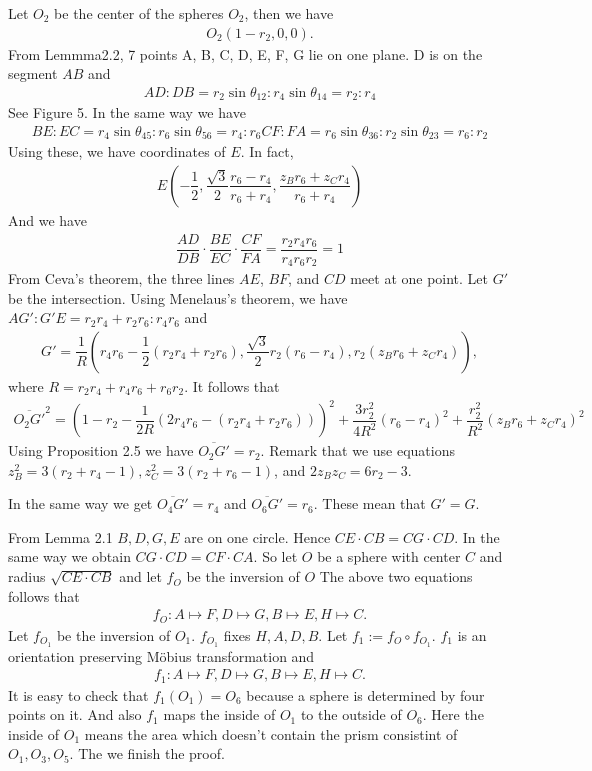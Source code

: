 \documentclass[dvipdfmx]{interact}
\theoremstyle{plain}%
\theoremstyle{definition}
\theoremstyle{remark}
\theoremstyle{problemstyle}
\begin{document}
Let $O_2$ be the center of the spheres $O_2$, then we have
\begin{align*}
 O_2(1 - r_2, 0, 0).
\end{align*}
From Lemmma2.2, 7 points A, B, C, D, E, F, G lie on one plane. D is on
the segment $AB$ and
\begin{align*}
 AD : DB = r_2\sin\theta_{12} : r_4\sin\theta_{14} = r_2 : r_4
\end{align*}
See Figure 5. In the same way we have
\begin{align*}
 BE : EC = r_4\sin\theta_{45} : r_6\sin\theta_{56} = r_4:r_6
 CF : FA = r_6\sin\theta_{36} : r_2\sin\theta_{23} = r_6:r_2
\end{align*}
Using these, we have coordinates of $E$. In fact,
\begin{align*}
 E(-\dfrac{1}{2},\dfrac{\sqrt{3}}{2}\dfrac{r_6-r_4}{r_6 + r_4},
 \dfrac{z_Br_6 + z_C r_4}{r_6 + r_4})
\end{align*}
And we have
\begin{align*}
 \dfrac{AD}{DB} \cdot \dfrac{BE}{EC} \cdot \dfrac{CF}{FA} = \dfrac{r_2r_4r_6}{r_4r_6r_2} = 1
\end{align*}
From Ceva's theorem, the three lines $AE$, $BF$, and $CD$ meet at one
point. Let $G'$ be the intersection. Using Menelaus's theorem, we have
$AG':G'E = r_2r_4 + r_2r_6:r_4r_6$ and
\begin{align*}
 G' = \dfrac{1}{R}(r_4r_6 - \dfrac{1}{2}(r_2r_4 + r_2r_6), 
 \dfrac{\sqrt{3}}{2}r_2(r_6 - r_4), r_2(z_Br_6 + z_Cr_4)),
\end{align*}
where $R = r_2r_4 + r_4r_6 + r_6r_2.$ It follows that
\begin{align*}
 \overline{O_2G'}^2 = (1 - r_2 - \dfrac{1}{2R}(2r_4r_6 - (r_2r_4 +
 r_2r_6)))^2 + \dfrac{3r^2_2}{4R^2}(r_6 - r_4)^2 +
 \dfrac{r_2^2}{R^2}(z_Br_6 + z_Cr_4)^2
\end{align*}
Using Proposition 2.5 we have $\overline{O_2G'} = r_2$. Remark that we
use equations $z_B^2 = 3(r_2 + r_4 - 1), z_C^2 = 3(r_2 + r_6 - 1)$, and
$2z_Bz_C = 6r_2 - 3$.

In the same way we get $\overline{O_4G'} = r_4$ and 
$\overline{O_6G'} = r_6$. These mean that $G' = G$.

From Lemma 2.1 $B, D, G, E$ are on one circle. Hence
$CE \cdot CB = CG \cdot CD$. In the same way we obtain 
$CG \cdot CD = CF \cdot CA$. So let $O$ be a sphere with center $C$ and
radius $\sqrt{CE \cdot CB}$ and let $f_O$ be the inversion of $O$
The above two equations follows that
\begin{align*}
 f_O: A \mapsto F, D \mapsto G, B \mapsto E, H \mapsto C.
\end{align*}
Let $f_{O_1}$ be the inversion of $O_1$. $f_{O_1}$ fixes $H, A, D, B$.
Let $f_1 := f_O \circ f_{O_1}$.
$f_1$ is an orientation preserving M\"obius transformation and
\begin{align*}
 f_1 : A \mapsto F, D \mapsto G, B \mapsto E, H \mapsto C.
\end{align*}
It is easy to check that $f_1(O_1) = O_6$ because a sphere is determined
by four points on it. And also $f_1$ maps the inside of $O_1$ to the
outside of $O_6$. Here the inside of $O_1$ means the area which doesn't
contain the prism consistint of $O_1, O_3, O_5$. The we finish the
proof.
\end{document}
